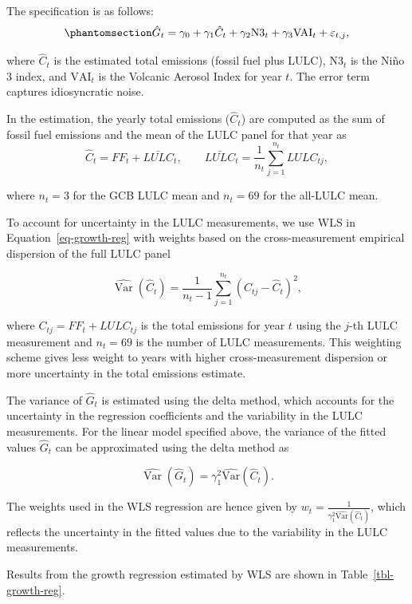 \documentclass[
  12pt,
  letterpaper,
  DIV=11,
  numbers=noendperiod]{scrartcl}
\begin{document}
The specification is as follows:
\begin{equation}\protect\phantomsection\label{eq-growth-reg}{
\hat{G}_t = \gamma_0 + \gamma_1 \hat{C}_t + \gamma_2 \text{N3}_t + \gamma_3 \text{VAI}_t + \varepsilon_{t,j},
}\end{equation}

where \(\hat{C}_t\) is the estimated total emissions (fossil fuel plus
LULC), \(\text{N3}_t\) is the Niño 3 index, and \(\text{VAI}_t\) is the
Volcanic Aerosol Index for year \(t\). The error term captures
idiosyncratic noise.

In the estimation, the yearly total emissions (\(\hat{C}_t\)) are
computed as the sum of fossil fuel emissions and the mean of the LULC
panel for that year as \[
\hat C_t = FF_t + \bar{LULC}_t, \qquad
\bar{LULC}_t = \frac{1}{n_t}\sum_{j=1}^{n_t} LULC_{tj},
\]

where \(n_t=3\) for the GCB LULC mean and \(n_t=69\) for the all-LULC
mean.

To account for uncertainty in the LULC measurements, we use WLS in
Equation~\ref{eq-growth-reg} with weights based on the cross-measurement
empirical dispersion of the full LULC panel

\[
\widehat{\operatorname{Var}}({\hat{C}_t}) = \frac{1}{n_t-1} \sum_{j=1}^{n_t} (C_{tj} - \hat{C}_t)^2,
\]

where \(C_{tj} = FF_t + LULC_{tj}\) is the total emissions for year
\(t\) using the \(j\)-th LULC measurement and \(n_t=69\) is the number
of LULC measurements. This weighting scheme gives less weight to years
with higher cross-measurement dispersion or more uncertainty in the
total emissions estimate.

The variance of \(\hat{G}_t\) is estimated using the delta method, which
accounts for the uncertainty in the regression coefficients and the
variability in the LULC measurements. For the linear model specified
above, the variance of the fitted values \(\hat{G}_t\) can be
approximated using the delta method as

\[
\widehat{\operatorname{Var}}(\hat{G}_t) = \gamma_1^2 \operatorname{\widehat{Var}}(\hat{C}_t). 
\]

The weights used in the WLS regression are hence given by
\(w_t = \frac{1}{\gamma_1^2 \operatorname{\widehat{Var}}(\hat{C}_t)}\),
which reflects the uncertainty in the fitted values due to the
variability in the LULC measurements.

Results from the growth regression estimated by WLS are shown in
Table~\ref{tbl-growth-reg}.
\end{document}
